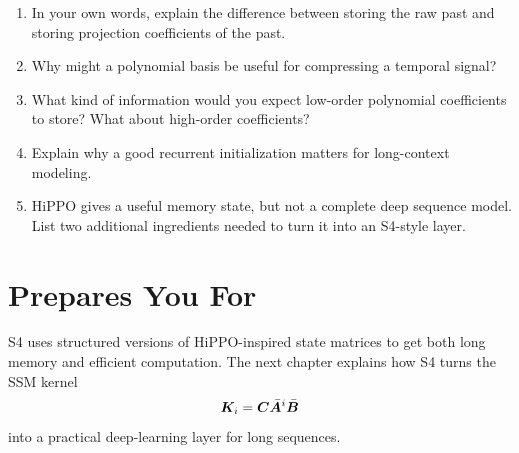 \begin{enumerate}
  \item In your own words, explain the difference between storing the raw past and
  storing projection coefficients of the past.
  \item Why might a polynomial basis be useful for compressing a temporal signal?
  \item What kind of information would you expect low-order polynomial coefficients to
  store? What about high-order coefficients?
  \item Explain why a good recurrent initialization matters for long-context modeling.
  \item HiPPO gives a useful memory state, but not a complete deep sequence model. List
  two additional ingredients needed to turn it into an S4-style layer.
\end{enumerate}

\section{Prepares You For}

S4 uses structured versions of HiPPO-inspired state matrices to get both long memory and
efficient computation. The next chapter explains how S4 turns the SSM kernel
\[
  \bm{K}_i=\bm{C}\bar{\bm{A}}^i\bar{\bm{B}}
\]
into a practical deep-learning layer for long sequences.

